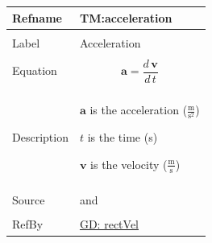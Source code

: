 \documentclass[12pt]{article}
\begin{document}
\noindent \begin{minipage}{\textwidth}
\begin{tabular}{p{} p{}}
\toprule \textbf{Refname} & \textbf{TM:acceleration}
\label{TM:acceleration}
\\ \midrule \\
Label & Acceleration
\\ \midrule \\
Equation & \begin{displaymath}
           \mathbf{a}=\frac{d\,\mathbf{v}}{d\,t}
           \end{displaymath}
\\ \midrule \\
Description & \begin{symbDescription}
              \item{$\mathbf{a}$ is the acceleration ($\frac{\text{m}}{\text{s}^{2}}$)}
              \item{$t$ is the time (s)}
              \item{$\mathbf{v}$ is the velocity ($\frac{\text{m}}{\text{s}}$)}
              \end{symbDescription}
\\ \midrule \\
Source & \cite{accelerationWiki} and \cite[(pg. 7)]{hibbeler2004}
\\ \midrule \\
RefBy & \hyperref[GD:rectVel]{GD: rectVel}
\\ \bottomrule \end{tabular}
\end{minipage}
\par~
\end{document}
